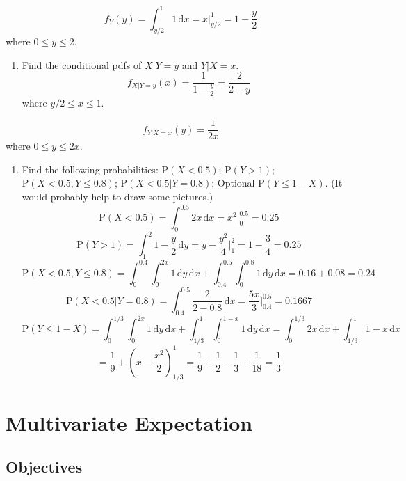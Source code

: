 \documentclass[
]{book}
\providecommand{\tightlist}{%
  \setlength{\itemsep}{0pt}\setlength{\parskip}{0pt}}
\begin{document}
\[
f_Y(y)=\int_{y/2}^1 1 \,\mathrm{d}x = x\bigg|_{y/2}^1 = 1-\frac{y}{2}
\]
where \(0 \leq y \leq 2\).

\begin{enumerate}
\def\labelenumi{\alph{enumi}.}
\setcounter{enumi}{2}
\tightlist
\item
  Find the conditional pdfs of \(X|Y=y\) and \(Y|X=x\).
  \[
  f_{X|Y=y}(x)=\frac{1}{1-\frac{y}{2}}=\frac{2}{2-y} 
  \]
  where \(y/2 \leq x \leq 1\).
\end{enumerate}

\[
f_{Y|X=x}(y)=\frac{1}{2x}
\]
where \(0\leq y \leq 2x\).

\begin{enumerate}
\def\labelenumi{\alph{enumi}.}
\setcounter{enumi}{3}
\tightlist
\item
  Find the following probabilities: \(\mbox{P}(X<0.5)\); \(\mbox{P}(Y>1)\); \(\mbox{P}(X<0.5,Y\leq 0.8)\); \(\mbox{P}(X<0.5|Y= 0.8)\); Optional \(\mbox{P}(Y\leq 1-X)\). (It would probably help to draw some pictures.)
  \[
  \mbox{P}(X<0.5)=\int_0^{0.5} 2x \,\mathrm{d}x = x^2\bigg|_0^{0.5}=0.25
  \]
  \[
  \mbox{P}(Y>1)=\int_1^2 1-\frac{y}{2}\,\mathrm{d}y = y-\frac{y^2}{4}\bigg|_1^2 = 1-\frac{3}{4}=0.25
  \]
  \[
  \mbox{P}(X<0.5,Y\leq 0.8)=\int_0^{0.4}\int_0^{2x} 1 \,\mathrm{d}y \,\mathrm{d}x + \int_{0.4}^{0.5}\int_0^{0.8} 1 \,\mathrm{d}y \,\mathrm{d}x = 0.16+0.08=0.24
  \]
  \[
  \mbox{P}(X<0.5|Y= 0.8)=\int_{0.4}^{0.5} \frac{2}{2-0.8}\,\mathrm{d}x = \frac{5x}{3}\bigg|_{0.4}^{0.5}=0.1667
  \]
  \[
  \mbox{P}(Y\leq 1-X)=\int_0^{1/3}\int_0^{2x} 1 \,\mathrm{d}y \,\mathrm{d}x + \int_{1/3}^1\int_0^{1-x}1 \,\mathrm{d}y \,\mathrm{d}x = \int_0^{1/3}2x\,\mathrm{d}x + \int_{1/3}^1 1-x\,\mathrm{d}x
  \]
  \[
  =\frac{1}{9}+\left(x-\frac{x^2}{2}\right)_{1/3}^1=\frac{1}{9}+\frac{1}{2}-\frac{1}{3}+\frac{1}{18} = \frac{1}{3}
  \]
\end{enumerate}

\hypertarget{MULTIEXP}{%
\chapter{Multivariate Expectation}\label{MULTIEXP}}

\newcommand{\E}{\mbox{E}}
\newcommand{\Var}{\mbox{Var}}
\newcommand{\Cov}{\mbox{Cov}}
\newcommand{\Prob}{\mbox{P}}
\newcommand{\diff}{\,\mathrm{d}}

\hypertarget{objectives-14}{%
\section{Objectives}\label{objectives-14}}
\end{document}
